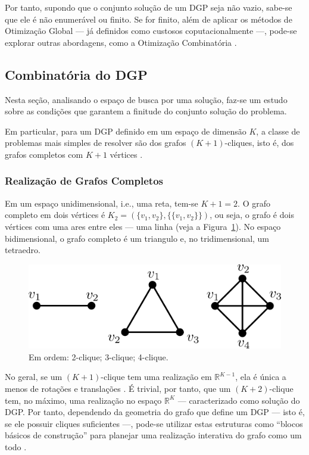 \documentclass[a4paper,12pt]{article}
\begin{document}
Por tanto, supondo que o conjunto solução de um DGP seja não vazio, sabe-se que ele é não enumerável ou finito. Se for finito, além de aplicar os métodos de Otimização Global --- já definidos como custosos coputacionalmente ---, pode-se explorar outras abordagens, como a Otimização Combinatória \cite{carlileBook31Coloquio}. 

\subsection{Combinatória do DGP}

Nesta seção, analisando o espaço de busca por uma solução, faz-se um estudo sobre as condições que garantem a finitude do conjunto solução do problema. 

Em particular, para um DGP definido em um espaço de dimensão $K$, a classe de problemas mais simples de resolver são dos grafos $(K+1)$-cliques, isto é, dos grafos completos com $K+1$ vértices \cite{libertiEDG}.

\subsubsection{Realização de Grafos Completos}

Em um espaço unidimensional, i.e., uma reta, tem-se $K+1 = 2$. O grafo completo em dois vértices é $K_2 = (\{v_1,v_2\}, \{\{v_1,v_2\}\})$, ou seja, o grafo é dois vértices com uma ares entre eles --- uma linha (veja a Figura~\ref{fig:grafoCompleto}). No espaço bidimensional, o grafo completo é um triangulo e, no tridimensional, um tetraedro.

\begin{figure}[H]
	\begin{center}
		\includegraphics[width=0.55\linewidth]{figures/grafoCompleto.png}
	\end{center}
	\caption{Em ordem: 2-clique; 3-clique; 4-clique.}
	\label{fig:grafoCompleto}
\end{figure}

No geral, se um $(K+1)$-clique tem uma realização em $\mathbb{R}^{K-1}$, ela é única a menos de rotações e translações \cite{libertiEDG}. É trivial, por tanto, que um $(K+2)$-clique tem, no máximo, uma realização no espaço $\mathbb{R}^K$ --- caracterizado como solução do DGP. Por tanto, dependendo da geometria do grafo que define um DGP --- isto é, se ele possuir cliques suficientes ---, pode-se utilizar estas estruturas como ``blocos básicos de construção'' para planejar uma realização interativa do grafo como um todo \cite{libertiEDG}.
\end{document}
